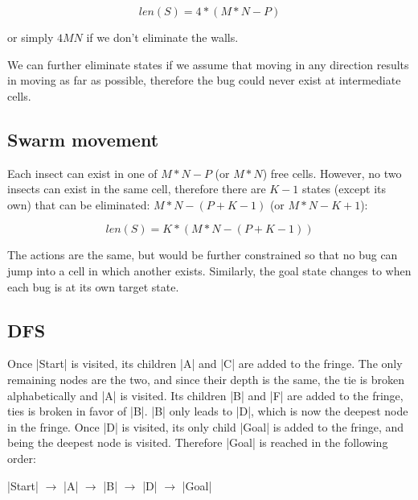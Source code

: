 \documentclass{homework}
\begin{document}
\begin{equation*}
    len(S) = 4 * (M * N - P)
\end{equation*}

or simply $4MN$ if we don't eliminate the walls.

We can further eliminate states if we assume that moving in any direction results in moving as far as possible, therefore the bug could never exist at intermediate cells.

\subsection{Swarm movement}
Each insect can exist in one of $M * N - P$ (or $M * N$) free cells. However, no two insects can exist in the same cell, therefore there are $K - 1$ states (except its own) that can be eliminated: $M * N - (P + K - 1)$ (or $M * N - K + 1$):

\begin{equation*}
    len(S) = K * (M * N - (P + K - 1))
\end{equation*}

The actions are the same, but would be further constrained so that no bug can jump into a cell in which another exists. Similarly, the goal state changes to when each bug is at its own target state.

\clearpage

\exercise[2]
\subsection{DFS}
Once \cverb|Start| is visited, its children \cverb|A| and \cverb|C| are added to the fringe. The only remaining nodes are the two, and since their depth is the same, the tie is broken alphabetically and \cverb|A| is visited. Its children \cverb|B| and \cverb|F| are added to the fringe, ties is broken in favor of \cverb|B|. \cverb|B| only leads to \cverb|D|, which is now the deepest node in the fringe. Once \cverb|D| is visited, its only child \cverb|Goal| is added to the fringe, and being the deepest node is visited. Therefore \cverb|Goal| is reached in the following order:

\cverb|Start| $\xrightarrow{}$ \cverb|A| $\xrightarrow{}$ \cverb|B| $\xrightarrow{}$ \cverb|D| $\xrightarrow{}$ \cverb|Goal|
\begin{figure}[h]
    \centering
    
    \label{fig:q2p1dfs}
\end{figure}
\end{document}
